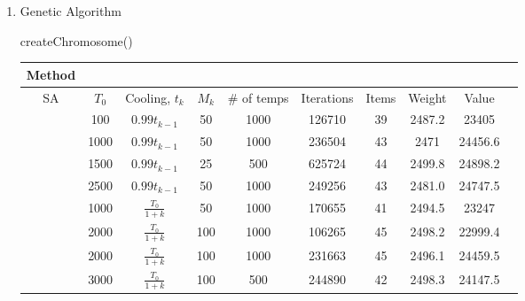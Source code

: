 \documentclass[11pt]{article}
\begin{document}
\begin{enumerate}
\begin{description}
\end{description}

\item Genetic Algorithm
\begin{description}
\item[createChromosome()]
\end{description}



\begin{tabular}{c*{9}{c}}
Method\\ \hline
SA&$T_0$&Cooling, $t_k$&$M_k$& \# of temps&Iterations&Items&Weight&Value\\ \hline
&100&$0.99t_{k-1}$&50&1000&126710&39&2487.2&23405\\
&1000&$0.99t_{k-1}$&50&1000&236504&43&2471&24456.6\\
&1500&$0.99t_{k-1}$&25&500&625724&44&2499.8&24898.2\\
&2500&$0.99t_{k-1}$&50&1000&249256&43&2481.0&24747.5\\
&1000&$\frac{T_0}{1+k}$&50&1000&170655&41&2494.5&23247\\
&2000&$\frac{T_0}{1+k}$&100&1000&106265&45&2498.2&22999.4\\
&2000&$\frac{T_0}{1+k}$&100&1000&231663&45&2496.1&24459.5\\
&3000&$\frac{T_0}{1+k}$&100&500&244890&42&2498.3&24147.5\\

\hline
\end{tabular}

\end{enumerate}
\end{document}
